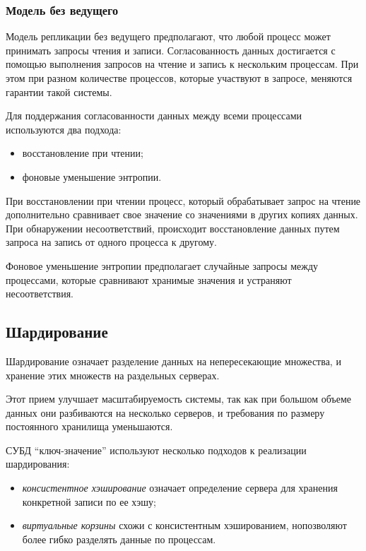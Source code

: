 \documentclass[14pt, russian]{scrartcl}
\begin{document}
\subsubsection{Модель без ведущего}

Модель репликации без ведущего предполагают, что любой процесс может принимать
запросы чтения и записи. Согласованность данных достигается с помощью выполнения
запросов на чтение и запись к нескольким процессам. При этом при разном
количестве процессов, которые участвуют в запросе, меняются гарантии такой
системы.

Для поддержания согласованности данных между всеми процессами используются два подхода\cite{kleppmann2019designing}:

\begin{itemize}
  \item восстановление при чтении;
  \item фоновые уменьшение энтропии.
\end{itemize}

При восстановлении при чтении процесс, который обрабатывает запрос на чтение
дополнительно сравнивает свое значение со значениями в других копиях данных. При
обнаружении несоответствий, происходит восстановление данных путем запроса на
запись от одного процесса к другому.

Фоновое уменьшение энтропии предполагает случайные запросы между процессами,
которые сравнивают хранимые значения и устраняют несоответствия.

\subsection{Шардирование}

Шардирование означает разделение данных на непересекающие множества, и хранение
этих множеств на раздельных серверах.

Этот прием улучшает масштабируемость системы, так как при большом объеме данных
они разбиваются на несколько серверов, и требования по размеру постоянного
хранилища уменьшаются.

СУБД ``ключ-значение'' используют несколько подходов к реализации шардирования:

\begin{itemize}
  \item \emph{консистентное хэширование} означает определение сервера для
        хранения конкретной записи по ее хэшу;
  \item \emph{виртуальные корзины} схожи с консистентным хэшированием,
        нопозволяют более гибко разделять данные по процессам.
\end{itemize}
\end{document}
